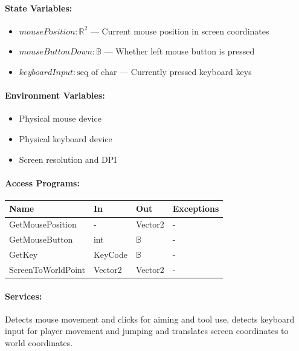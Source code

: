 \documentclass[12pt, titlepage]{article}
\begin{document}
\paragraph{State Variables:}
\begin{itemize}
\item $mousePosition : \mathbb{R}^2$ --- Current mouse position in screen coordinates
\item $mouseButtonDown : \mathbb{B}$ --- Whether left mouse button is pressed
\item $keyboardInput : \text{seq of char}$ --- Currently pressed keyboard keys
\end{itemize}

\paragraph{Environment Variables:}
\begin{itemize}
\item Physical mouse device
\item Physical keyboard device
\item Screen resolution and DPI
\end{itemize}

\paragraph{Access Programs:}

\begin{center}
\begin{tabular}{p{4cm}p{3cm}p{3cm}p{4cm}}
\toprule
\textbf{Name} & \textbf{In} & \textbf{Out} & \textbf{Exceptions} \\
\midrule
GetMousePosition & - & Vector2 & - \\
GetMouseButton & int & $\mathbb{B}$ & - \\
GetKey & KeyCode & $\mathbb{B}$ & - \\
ScreenToWorldPoint & Vector2 & Vector2 & - \\
\bottomrule
\end{tabular}
\end{center}

\paragraph{Services:}
Detects mouse movement and clicks for aiming and tool use, detects keyboard input for player movement and jumping and translates screen coordinates to world coordinates.
\end{document}
